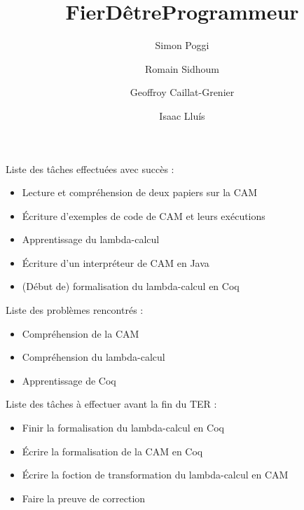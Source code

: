 \documentclass[12pt]{article}
\title{FierDêtreProgrammeur}
\author{Simon Poggi \and Romain Sidhoum \and Geoffroy Caillat-Grenier \and Isaac Lluís}
\date{}
\begin{document}
\maketitle

\noindent
Liste des tâches effectuées avec succès :
\begin{itemize}
  \item Lecture et compréhension de deux papiers sur la CAM
  \item Écriture d'exemples de code de CAM et leurs exécutions 
  \item Apprentissage du lambda-calcul
  \item Écriture d'un interpréteur de CAM en Java
  \item (Début de) formalisation du lambda-calcul en Coq
\end{itemize}

\par\leavevmode\par
\noindent
Liste des problèmes rencontrés :
\begin{itemize}
  \item Compréhension de la CAM
  \item Compréhension du lambda-calcul
  \item Apprentissage de Coq
\end{itemize}

\par\leavevmode\par
\noindent
Liste des tâches à effectuer avant la fin du TER :
\begin {itemize}
  \item Finir la formalisation du lambda-calcul en Coq
  \item Écrire la formalisation de la CAM en Coq
  \item Écrire la foction de transformation du lambda-calcul en CAM
  \item Faire la preuve de correction
\end{itemize}

\thispagestyle{empty}
\end{document}
